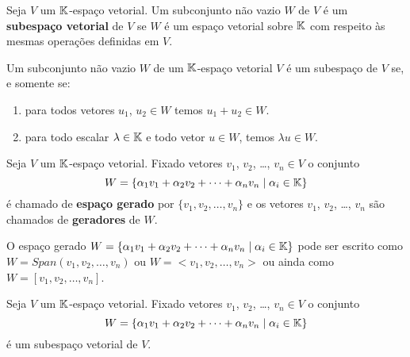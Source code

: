 \documentclass{beamer}
\begin{document}
\begin{frame}
  \begin{definicao}
    Seja $V$ um $\mathbb{K}$-espaço vetorial.  Um subconjunto não vazio $W$  de $V$ é um \textbf{subespaço vetorial} de $V$  se $W$ é um espaço vetorial
    sobre $\mathbb{K}$  com respeito às mesmas operações definidas em $V$.
  \end{definicao}

  \begin{teorema}
    Um subconjunto não vazio $W$  de um $\mathbb{K}$-espaço vetorial $V$  é um subespaço de $V$  se, e somente se:
    \begin{enumerate}[label={\roman*})]
      \item para todos vetores $u_1$, $u_2 \in W$  temos $u_1 + u_2 \in W$.
      \item para todo escalar $\lambda \in \mathbb{K}$  e todo vetor $u \in W$,  temos $\lambda u\in W$.
    \end{enumerate}
  \end{teorema}
\end{frame}

\begin{frame}
  \begin{definicao}
    Seja $V$ um $\mathbb{K}$-espaço vetorial.  Fixado vetores $v_1$, $v_2$, \dots, $v_n \in V$  o conjunto
    \[
      W = \{\alpha_1v_1  + \alpha_2v_2  + \cdots + \alpha_nv_n  \mid \alpha_i \in \mathbb{K}\}
    \]
    é chamado de \textbf{espaço gerado}  por $\{v_1, v_2, \dots, v_n\}$  e os vetores $v_1$, $v_2$, \dots, $v_n$  são chamados de \textbf{geradores} de $W$.
  \end{definicao}

  \begin{notacao}
    O espaço gerado $W = \{\alpha_1v_1 + \alpha_2v_2 + \cdots + \alpha_nv_n \mid \alpha_i \in \mathbb{K}\}$  pode ser escrito como $W = Span(v_1, v_2, \dots, v_n)$  ou $W = <v_1, v_2, \dots, v_n>$  ou ainda como $W = [v_1, v_2, \dots, v_n]$.
  \end{notacao}
\end{frame}

\begin{frame}
  \begin{proposicao}
    Seja $V$ um $\mathbb{K}$-espaço vetorial.  Fixado vetores $v_1$, $v_2$, \dots, $v_n \in V$  o conjunto
    \[
      W = \{\alpha_1v_1  + \alpha_2v_2  + \cdots + \alpha_nv_n  \mid \alpha_i \in \mathbb{K}\}
    \]
    é um subespaço vetorial de $V$.
  \end{proposicao}
\end{frame}
\end{document}
